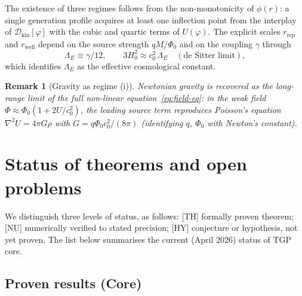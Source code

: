 \documentclass[11pt,a4paper]{article}
\renewcommand{\Phi}{\varPhi}
\newcommand{\PhiZero}{\varPhi_{0}}
\newcommand{\DD}{\mathcal{D}}
\newtheorem{remark}[axiom]{Remark}
\begin{document}
The existence of three regimes follows from the non-monotonicity of
$\phi(r)$: a single generation profile acquires at least one inflection
point from the interplay of $\DD_{\mathrm{kin}}[\varphi]$ with the cubic
and quartic terms of $U(\varphi)$. The explicit scales $r_{\mathrm{rep}}$
and $r_{\mathrm{well}}$ depend on the source strength $qM/\PhiZero$ and on
the coupling $\gamma$ through
\begin{equation}\label{eq:Lambda-E}
  \Lambda_{E}\equiv\gamma/12,
  \qquad
  3H_{0}^{2}\approx c_{0}^{2}\,\Lambda_{E}
  \quad(\text{de Sitter limit}),
\end{equation}
which identifies $\Lambda_{E}$ as the effective cosmological constant.

\begin{remark}[Gravity as regime (i)]
Newtonian gravity is recovered as the long-range limit of the full
non-linear equation~\eqref{eq:field-eq}: in the weak field
$\Phi\approx\PhiZero(1+2U/c_{0}^{2})$, the leading source term reproduces
Poisson's equation $\nabla^{2}U=4\pi G\rho$ with
$G=q\PhiZero c_{0}^{2}/(8\pi)$ (identifying $q$, $\PhiZero$ with
Newton's constant).
\end{remark}

\section{Status of theorems and open problems}\label{sec:status}

We distinguish three levels of status, as follows:
\textsf{[TH]} formally proven theorem;
\textsf{[NU]} numerically verified to stated precision;
\textsf{[HY]} conjecture or hypothesis, not yet proven.
The list below summarises the current (April 2026) status of TGP core.

\subsection{Proven results (Core)}
\end{document}
